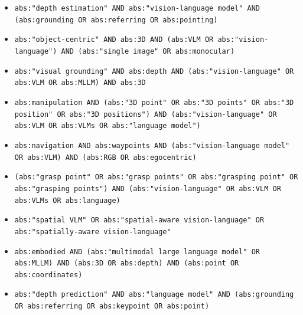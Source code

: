 {\begin{itemize}
\item[\texttt{P4.14}] \texttt{abs:"depth estimation" AND abs:"vision-language model" AND (abs:grounding OR abs:referring OR abs:pointing)}
\item[\texttt{P4.15}] \texttt{abs:"object-centric" AND abs:3D AND (abs:VLM OR abs:"vision-language") AND (abs:"single image" OR abs:monocular)}
\item[\texttt{P4.16}] \texttt{abs:"visual grounding" AND abs:depth AND (abs:"vision-language" OR abs:VLM OR abs:MLLM) AND abs:3D}
\item[\texttt{P4.17}] \texttt{abs:manipulation AND (abs:"3D point" OR abs:"3D points" OR abs:"3D position" OR abs:"3D positions") AND (abs:"vision-language" OR abs:VLM OR abs:VLMs OR abs:"language model")}
\item[\texttt{P4.18}] \texttt{abs:navigation AND abs:waypoints AND (abs:"vision-language model" OR abs:VLM) AND (abs:RGB OR abs:egocentric)}
\item[\texttt{P4.19}] \texttt{(abs:"grasp point" OR abs:"grasp points" OR abs:"grasping point" OR abs:"grasping points") AND (abs:"vision-language" OR abs:VLM OR abs:VLMs OR abs:language)}
\item[\texttt{P4.20}] \texttt{abs:"spatial VLM" OR abs:"spatial-aware vision-language" OR abs:"spatially-aware vision-language"}
\item[\texttt{P4.21}] \texttt{abs:embodied AND (abs:"multimodal large language model" OR abs:MLLM) AND (abs:3D OR abs:depth) AND (abs:point OR abs:coordinates)}
\item[\texttt{P4.22}] \texttt{abs:"depth prediction" AND abs:"language model" AND (abs:grounding OR abs:referring OR abs:keypoint OR abs:point)}
\end{itemize}}

